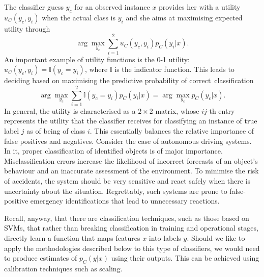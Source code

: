 The classifier guess $y_c$ for an observed instance $x$ provides her with a utility $u_C (y_c, y_i)$ when the
 actual class is $y_i$ and she aims at maximising expected utility
 through  
\begin{equation}\label{amarinha}
 \arg\max_{y_c} \sum_{i=1}^2
u_C (y_c , y_i ) p _C (y_i | x ).
\end{equation}
An important example of utility functions is the 0-1 utility: $u_C (y_c, y_i) = \mathbb{I}(y_c = y_i)$, where $\mathbb{I}$ is the indicator function. This leads to deciding based on maximising the
 predictive probability of correct~classification
\begin{equation}\label{seen}
\arg\max_{y_c} \sum_{i=1}^2 \mathbb{I}(y_c = y_i) p_C(y_i|x) = \arg\max_{y_c} p_C(y_c|x).
\end{equation}
%
In general, the 
utility is characterised as
a $2 \times 2$ matrix, whose $ij$-th entry 
represents the utility that the classifier
receives for classifying an instance of true label $j$ as of being of class $i$. This essentially balances the relative importance of false positives and negatives. Consider the case of autonomous driving systems. 
In it, proper classification of identified objects is of
major 
importance. Misclassification errors increase the 
likelihood of incorrect forecasts of an object’s behaviour and an inaccurate assessment of the environment. To minimise the risk of accidents, the system should be very sensitive and react safely when there is uncertainty about the situation. Regrettably, such systems are prone to false-positive emergency identifications that lead to unnecessary reactions. %



Recall, anyway, that there are classification techniques, such as those based on SVMs, that rather than breaking classification in training and operational stages, directly learn a function that maps features $x$ into labels $y$. Should we like to apply the methodologies described below to this type of classifiers, we would need to produce estimates of $p_C(y|x)$ using their outputs. This can be achieved using calibration techniques such as 
\parencite{platt1999probabilistic} scaling.

